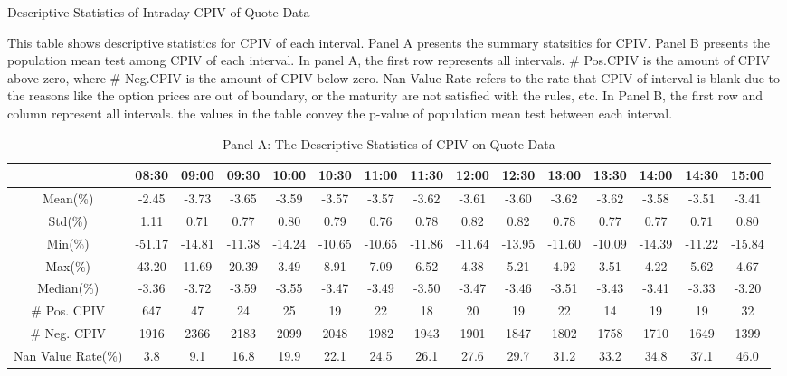 \begin{table}[h]
\centering
\caption{Descriptive Statistics of Intraday CPIV of Quote Data}\label{table:stats_of_CPIV}
\begin{threeparttable}

\medskip


{\scriptsize 
This table shows descriptive statistics for CPIV of each interval. Panel A presents the summary statsitics for CPIV. Panel B presents the population mean test among CPIV of each interval. In panel A, the first row represents all intervals.  \# Pos.CPIV is the amount of CPIV above zero, where \# Neg.CPIV is the amount of CPIV below zero. Nan Value Rate refers to the rate that CPIV of interval is blank due to the reasons like the option prices are out of boundary, or the maturity are not satisfied with the rules, etc. In Panel B, the first row and column represent all intervals. the values in the table convey the p-value of population mean test between each interval. 
}
\medskip
\begin{subtable}[t]{\linewidth}

\caption{Panel A: The Descriptive Statistics of CPIV on Quote Data }
\tiny
\begin{tabular}{ccccccccccccccc}
\toprule
\textbf{}        & 08:30 & 09:00 & 09:30 & 10:00 & 10:30 & 11:00 & 11:30 & 12:00 & 12:30 & 13:00 & 13:30 & 14:00 & 14:30 & 15:00 \\ \midrule
Mean(\%)         & -2.45 & -3.73 & -3.65 & -3.59 & -3.57 & -3.57 & -3.62 & -3.61 & -3.60 & -3.62 & -3.62 & -3.58 & -3.51 & -3.41 \\
Std(\%)          & 1.11  & 0.71  & 0.77  & 0.80  & 0.79  & 0.76  & 0.78  & 0.82  & 0.82  & 0.78  & 0.77  & 0.77  & 0.71  & 0.80  \\
Min(\%)          & -51.17 & -14.81 & -11.38 & -14.24 & -10.65 & -10.65 & -11.86 & -11.64 & -13.95 & -11.60 & -10.09 & -14.39 & -11.22 & -15.84 \\
Max(\%)          & 43.20  & 11.69  & 20.39  & 3.49   & 8.91   & 7.09   & 6.52   & 4.38   & 5.21   & 4.92   & 3.51   & 4.22   & 5.62   & 4.67   \\
Median(\%)       & -3.36  & -3.72  & -3.59  & -3.55  & -3.47  & -3.49  & -3.50  & -3.47  & -3.46  & -3.51  & -3.43  & -3.41  & -3.33  & -3.20  \\
\# Pos. CPIV     & 647   & 47    & 24    & 25    & 19    & 22    & 18    & 20    & 19    & 22    & 14    & 19    & 19    & 32    \\
\# Neg. CPIV     & 1916  & 2366  & 2183  & 2099  & 2048  & 1982  & 1943  & 1901  & 1847  & 1802  & 1758  & 1710  & 1649  & 1399  \\
Nan Value Rate(\%) & 3.8   & 9.1   & 16.8  & 19.9  & 22.1  & 24.5  & 26.1  & 27.6  & 29.7  & 31.2  & 33.2  & 34.8  & 37.1  & 46.0  \\ \bottomrule
\end{tabular}
\end{subtable}


\end{threeparttable}
\end{table}
